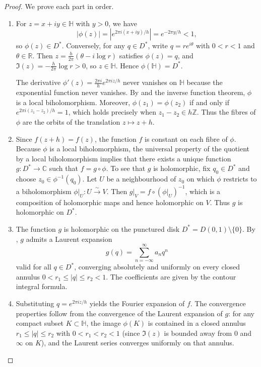 \begin{proof}
We prove each part in order.

\begin{enumerate}
  \item For $z = x + iy \in \mathbb{H}$ with $y > 0$, we have
  $$|\phi(z)| = |e^{2\pi i (x + iy) / h}| = e^{-2\pi y / h} < 1,$$
  so $\phi(z) \in D^*$. Conversely, for any $q \in D^*$, write $q = re^{i\theta}$ with $0 < r < 1$ and $\theta \in \mathbb{R}$. Then $z = \frac{h}{2\pi}(\theta - i \log r)$ satisfies $\phi(z) = q$, and $\Im(z) = -\frac{h}{2\pi} \log r > 0$, so $z \in \mathbb{H}$. Hence $\phi(\mathbb{H}) = D^*$.

  The derivative $\phi'(z) = \frac{2\pi i}{h} e^{2\pi i z / h}$ never vanishes on $\mathbb{H}$ because the exponential function never vanishes. By  and the inverse function theorem, $\phi$ is a local biholomorphism. Moreover, $\phi(z_1) = \phi(z_2)$ if and only if $e^{2\pi i (z_1 - z_2)/h} = 1$, which holds precisely when $z_1 - z_2 \in h\mathbb{Z}$. Thus the fibres of $\phi$ are the orbits of the translation $z \mapsto z + h$.

  \item Since $f(z + h) = f(z)$, the function $f$ is constant on each fibre of $\phi$. Because $\phi$ is a local biholomorphism, the universal property of the quotient by a local biholomorphism implies that there exists a unique function $g : D^* \to \mathbb{C}$ such that $f = g \circ \phi$. To see that $g$ is holomorphic, fix $q_0 \in D^*$ and choose $z_0 \in \phi^{-1}(q_0)$. Let $U$ be a neighbourhood of $z_0$ on which $\phi$ restricts to a biholomorphism $\phi|_U : U \xrightarrow{\sim} V$. Then $g|_V = f \circ (\phi|_U)^{-1}$, which is a composition of holomorphic maps and hence holomorphic on $V$. Thus $g$ is holomorphic on $D^*$.

  \item The function $g$ is holomorphic on the punctured disk $D^* = D(0, 1) \setminus \{0\}$. By , $g$ admits a Laurent expansion
  $$g(q) = \sum_{n=-\infty}^{\infty} a_n q^n$$
  valid for all $q \in D^*$, converging absolutely and uniformly on every closed annulus $0 < r_1 \leq |q| \leq r_2 < 1$. The coefficients are given by the contour integral formula.

  \item Substituting $q = e^{2\pi i z / h}$ yields the Fourier expansion of $f$. The convergence properties follow from the convergence of the Laurent expansion of $g$: for any compact subset $K \subset \mathbb{H}$, the image $\phi(K)$ is contained in a closed annulus $r_1 \leq |q| \leq r_2$ with $0 < r_1 < r_2 < 1$ (since $\Im(z)$ is bounded away from $0$ and $\infty$ on $K$), and the Laurent series converges uniformly on that annulus.


\end{enumerate}
\end{proof}
